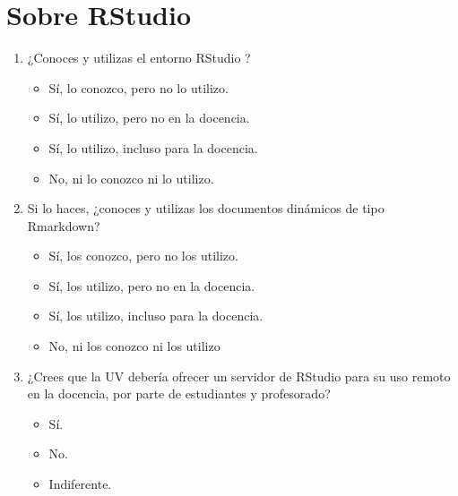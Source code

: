 \documentclass[a4paper,12pt]{article}
\newcounter{preg}[section]
\begin{document}
\section{Sobre RStudio}
\begin{enumerate}
\item {} ¿Conoces y utilizas el entorno RStudio \cite{RStudio}?
   \begin{itemize}
   \item Sí, lo conozco, pero no lo utilizo.
   \item Sí, lo utilizo, pero no en la docencia.
   \item Sí, lo utilizo, incluso para la docencia.
   \item No, ni lo conozco ni lo utilizo.
   \end{itemize}

\item {} Si lo haces, ¿conoces y utilizas los documentos dinámicos de tipo Rmarkdown?
   \begin{itemize}
   \item Sí, los conozco, pero no los utilizo.
   \item Sí, los utilizo, pero no en la docencia.
   \item Sí, los utilizo, incluso para la docencia.
   \item No, ni los conozco ni los utilizo
   \end{itemize}

\item {} ¿Crees que la UV debería ofrecer un servidor de RStudio para su uso remoto en la docencia,
      por parte de estudiantes y profesorado?
   \begin{itemize}
   \item Sí.
   \item No.
   \item Indiferente.
   \end{itemize}
\end{enumerate}
\end{document}
